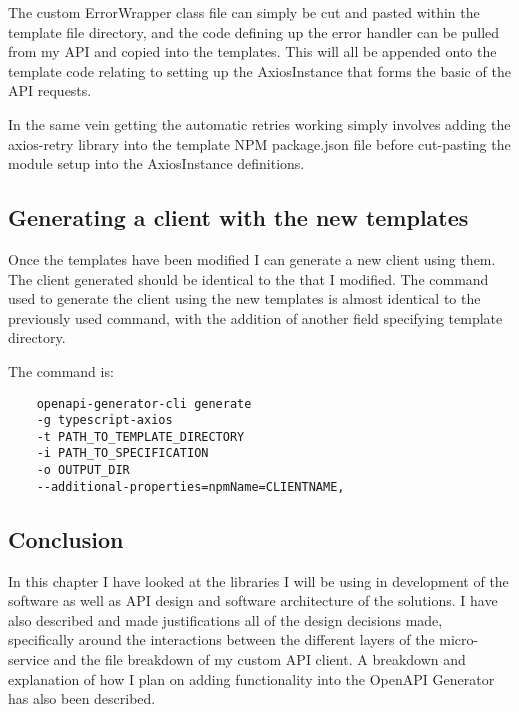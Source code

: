 The custom ErrorWrapper class file can simply be cut and pasted within the template file directory, and the code defining up the error handler can be pulled from my API and copied into the templates. This will all be appended onto the template code relating to setting up the AxiosInstance that forms the basic of the API requests.

In the same vein getting the automatic retries working simply involves adding the axios-retry library into the template NPM package.json file  before cut-pasting the module setup into the AxiosInstance definitions.

\subsection{Generating a client with the new templates}

Once the templates have been modified I can generate a new client using them. The client generated should be identical to the that I modified. The command used to generate the client using the new templates is almost identical to the previously used command, with the addition of another field specifying template directory.

The command is:
\begin{verbatim}
    openapi-generator-cli generate 
    -g typescript-axios
    -t PATH_TO_TEMPLATE_DIRECTORY
    -i PATH_TO_SPECIFICATION
    -o OUTPUT_DIR
    --additional-properties=npmName=CLIENTNAME,
\end{verbatim}
\subsection{Conclusion}
In this chapter I have looked at the libraries I will be using in development of the software as well as API design and software architecture of the solutions. I have also described and made justifications all of the design decisions made, specifically around the interactions between the different layers of the micro-service and the file breakdown of my custom API client. A breakdown and explanation of how I plan on adding functionality into the OpenAPI Generator has also been described.